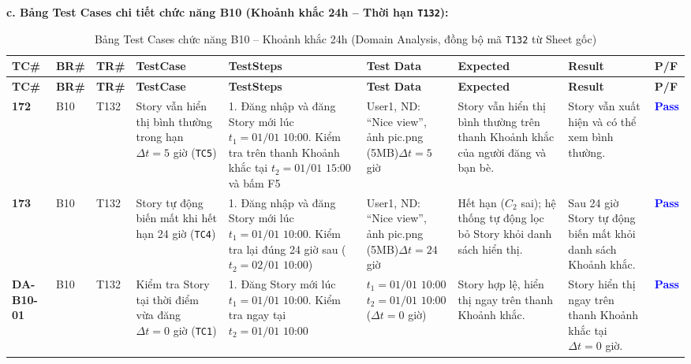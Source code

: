 \documentclass[11pt,a4paper]{article}
\begin{document}
\noindent\textbf{c. Bảng Test Cases chi tiết chức năng B10 (Khoảnh khắc 24h -- Thời hạn \texttt{T132}):}
\begingroup
\scriptsize
\setlength{\tabcolsep}{3pt}
\begin{longtable}{|C{0.95cm}|C{0.75cm}|C{0.95cm}|L{2.0cm}|L{2.95cm}|L{2.15cm}|L{2.6cm}|L{2.45cm}|C{0.85cm}|}
\hline
{}
\textbf{TC\#} & \textbf{BR\#} & \textbf{TR\#} & \textbf{TestCase} & \textbf{TestSteps} & \textbf{Test Data} & \textbf{Expected} & \textbf{Result} & \textbf{P/F} \tabularnewline
\hline
\endfirsthead
\hline
{}
\textbf{TC\#} & \textbf{BR\#} & \textbf{TR\#} & \textbf{TestCase} & \textbf{TestSteps} & \textbf{Test Data} & \textbf{Expected} & \textbf{Result} & \textbf{P/F} \tabularnewline
\hline
\endhead
\hline
\endfoot
\hline
\caption{Bảng Test Cases chức năng B10 -- Khoảnh khắc 24h (Domain Analysis, đồng bộ mã \texttt{T132} từ Sheet gốc)}
\endlastfoot
\textbf{172} & B10 & T132 & Story vẫn hiển thị bình thường trong hạn $\Delta t = 5$ giờ (\texttt{TC5}) & 1. Đăng nhập và đăng Story mới lúc $t_1 = \text{01/01 10:00}$. Kiểm tra trên thanh Khoảnh khắc tại $t_2 = \text{01/01 15:00}$ và bấm F5 & User1, ND: ``Nice view'', ảnh pic.png (5MB)\newline $\Delta t = 5$ giờ & Story vẫn hiển thị bình thường trên thanh Khoảnh khắc của người đăng và bạn bè. & Story vẫn xuất hiện và có thể xem bình thường. & \textcolor{blue}{\textbf{Pass}} \\ \hline
\textbf{173} & B10 & T132 & Story tự động biến mất khi hết hạn 24 giờ (\texttt{TC4}) & 1. Đăng nhập và đăng Story mới lúc $t_1 = \text{01/01 10:00}$. Kiểm tra lại đúng 24 giờ sau ($t_2 = \text{02/01 10:00}$) & User1, ND: ``Nice view'', ảnh pic.png (5MB)\newline $\Delta t = 24$ giờ & Hết hạn ($C_2$ sai); hệ thống tự động lọc bỏ Story khỏi danh sách hiển thị. & Sau 24 giờ Story tự động biến mất khỏi danh sách Khoảnh khắc. & \textcolor{blue}{\textbf{Pass}} \\ \hline
\textbf{DA-B10-01} & B10 & T132 & Kiểm tra Story tại thời điểm vừa đăng $\Delta t = 0$ giờ (\texttt{TC1}) & 1. Đăng Story mới lúc $t_1 = \text{01/01 10:00}$. Kiểm tra ngay tại $t_2 = \text{01/01 10:00}$ & $t_1 = \text{01/01 10:00}$\newline $t_2 = \text{01/01 10:00}$ ($\Delta t = 0$ giờ) & Story hợp lệ, hiển thị ngay trên thanh Khoảnh khắc. & Story hiển thị ngay trên thanh Khoảnh khắc tại $\Delta t = 0$ giờ. & \textcolor{blue}{\textbf{Pass}} \\ \hline

\end{longtable}
\end{document}
